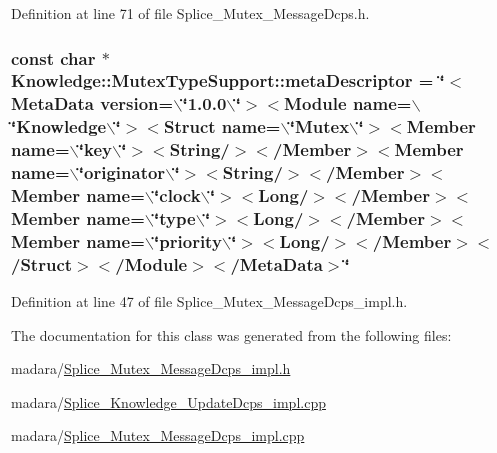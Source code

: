 Definition at line 71 of file Splice\_\-Mutex\_\-MessageDcps.h.

\hypertarget{classKnowledge_1_1MutexTypeSupport_a336a3aef8ac28553093abaf96b2a7d81}{
\subsubsection[{metaDescriptor}]{\setlength{\rightskip}{0pt plus 5cm}const char $\ast$ {\bf Knowledge::MutexTypeSupport::metaDescriptor} = \char`\"{}$<$MetaData version=$\backslash$\char`\"{}1.0.0$\backslash$\char`\"{}$>$$<$Module name=$\backslash$\char`\"{}Knowledge$\backslash$\char`\"{}$>$$<$Struct name=$\backslash$\char`\"{}Mutex$\backslash$\char`\"{}$>$$<$Member name=$\backslash$\char`\"{}key$\backslash$\char`\"{}$>$$<$String/$>$$<$/Member$>$$<$Member name=$\backslash$\char`\"{}originator$\backslash$\char`\"{}$>$$<$String/$>$$<$/Member$>$$<$Member name=$\backslash$\char`\"{}clock$\backslash$\char`\"{}$>$$<$Long/$>$$<$/Member$>$$<$Member name=$\backslash$\char`\"{}type$\backslash$\char`\"{}$>$$<$Long/$>$$<$/Member$>$$<$Member name=$\backslash$\char`\"{}priority$\backslash$\char`\"{}$>$$<$Long/$>$$<$/Member$>$$<$/Struct$>$$<$/Module$>$$<$/MetaData$>$\char`\"{}}}
\label{d3/d2e/classKnowledge_1_1MutexTypeSupport_a336a3aef8ac28553093abaf96b2a7d81}


Definition at line 47 of file Splice\_\-Mutex\_\-MessageDcps\_\-impl.h.



The documentation for this class was generated from the following files:\begin{DoxyCompactItemize}
\item 
madara/\hyperlink{Splice__Mutex__MessageDcps__impl_8h}{Splice\_\-Mutex\_\-MessageDcps\_\-impl.h}\item 
madara/\hyperlink{Splice__Knowledge__UpdateDcps__impl_8cpp}{Splice\_\-Knowledge\_\-UpdateDcps\_\-impl.cpp}\item 
madara/\hyperlink{Splice__Mutex__MessageDcps__impl_8cpp}{Splice\_\-Mutex\_\-MessageDcps\_\-impl.cpp}\end{DoxyCompactItemize}
